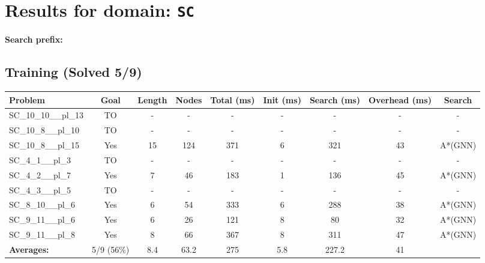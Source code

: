 \documentclass{article}
\begin{document}
\section*{Results for domain: \texttt{SC}}
\textbf{Search prefix:} 
\\[0.5cm]
\subsection*{Training (Solved 5/9)}
\begin{tabular}{lcccccccc}
\toprule
Problem & Goal & Length & Nodes & Total (ms) & Init (ms) & Search (ms) & Overhead (ms) & Search \\
\midrule
SC\_10\_10\_\_pl\_13 & TO & - & - & - & - & - & - & - \\
SC\_10\_8\_\_pl\_10 & TO & - & - & - & - & - & - & - \\
SC\_10\_8\_\_pl\_15 & Yes & 15 & 124 & 371 & 6 & 321 & 43 & A*(GNN) \\
SC\_4\_1\_\_pl\_3 & TO & - & - & - & - & - & - & - \\
SC\_4\_2\_\_pl\_7 & Yes & 7 & 46 & 183 & 1 & 136 & 45 & A*(GNN) \\
SC\_4\_3\_\_pl\_5 & TO & - & - & - & - & - & - & - \\
SC\_8\_10\_\_pl\_6 & Yes & 6 & 54 & 333 & 6 & 288 & 38 & A*(GNN) \\
SC\_9\_11\_\_pl\_6 & Yes & 6 & 26 & 121 & 8 & 80 & 32 & A*(GNN) \\
SC\_9\_11\_\_pl\_8 & Yes & 8 & 66 & 367 & 8 & 311 & 47 & A*(GNN) \\
\textbf{Averages:} & 5/9 (56\%) & 8.4 & 63.2 & 275 & 5.8 & 227.2 & 41 & \\
\bottomrule
\end{tabular}
\\[0.7cm]
\end{document}
